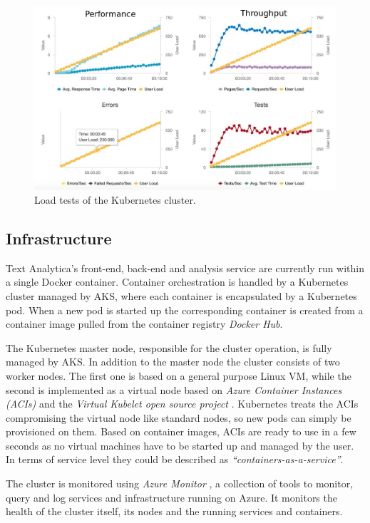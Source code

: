\documentclass[conference]{IEEEtran}
\begin{document}
\begin{figure}[ht!]
\includegraphics[width=170mm]{img/loadtest_01.png}
\caption{Load tests of the Kubernetes cluster.}
\label{img:loadtesting}
\end{figure}

\subsection{Infrastructure}
\label{subsec:infra}
Text Analytica’s front-end, back-end and analysis service are currently run within a single Docker container. Container orchestration is handled by a Kubernetes cluster managed by AKS, where each container is encapsulated by a Kubernetes pod. When a new pod is started up the corresponding container is created from a container image pulled from the container registry \textit{Docker Hub}\cite{DockerHub}.

The Kubernetes master node, responsible for the cluster operation, is fully managed by AKS. In addition to the master node the cluster consists of two worker nodes. The first one is based on a general purpose Linux VM, while the second is implemented as a virtual node based on \textit{Azure Container Instances (ACIs)} \cite{AzureContainerInstances} and the \textit{Virtual Kubelet open source project} \cite{VirtualKubelet} \cite{VirtualKubeletGithub}. Kubernetes treats the ACIs compromising the virtual node like standard nodes, so new pods can simply be provisioned on them. Based on container images, ACIs are ready to use in a few seconds as no virtual machines have to be started up and managed by the user. In terms of service level they could be described as \textit{“containers-as-a-service”}.

The cluster is monitored using \textit{Azure Monitor} \cite{AzureMonitor}, a collection of tools to monitor, query and log services and infrastructure running on Azure. It monitors the health of the cluster itself, its nodes and the running services and containers.
\end{document}
